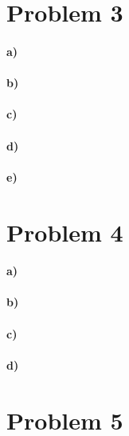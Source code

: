 \documentclass[12pt]{article}
\begin{document}
\section*{Problem 3}

\paragraph{a)}

\paragraph{b)}

\paragraph{c)}

\paragraph{d)}

\paragraph{e)}

\section*{Problem 4}

\paragraph{a)}

\paragraph{b)}

\paragraph{c)}

\paragraph{d)}

\section*{Problem 5}
\end{document}
